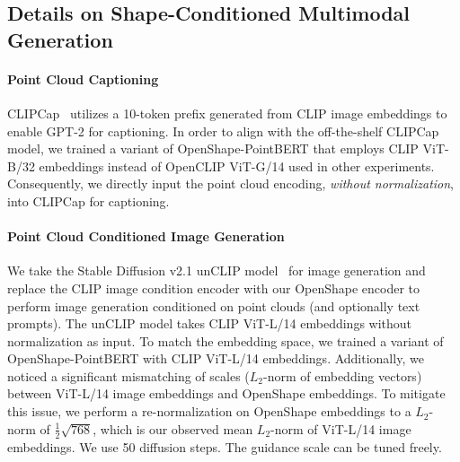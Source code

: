 \subsection{Details on Shape-Conditioned Multimodal Generation}
\paragraph{Point Cloud Captioning} 

CLIPCap~\cite{mokady2021clipcap} utilizes a 10-token prefix generated from CLIP image embeddings to enable GPT-2 for captioning. In order to align with the off-the-shelf CLIPCap model, we trained a variant of OpenShape-PointBERT that employs CLIP ViT-B/32 embeddings instead of OpenCLIP ViT-G/14 used in other experiments. Consequently, we directly input the point cloud encoding, \emph{without normalization}, into CLIPCap for captioning.

\paragraph{Point Cloud Conditioned Image Generation} We take the Stable Diffusion v2.1 unCLIP model~\cite{ramesh2022hierarchical} for image generation and replace the CLIP image condition encoder with our OpenShape encoder to perform image generation conditioned on point clouds (and optionally text prompts). The unCLIP model takes CLIP ViT-L/14 embeddings without normalization as input. To match the embedding space, we trained a variant of OpenShape-PointBERT with CLIP ViT-L/14 embeddings. Additionally, we noticed a significant mismatching of scales ($L_2$-norm of embedding vectors) between ViT-L/14 image embeddings and OpenShape embeddings. To mitigate this issue, we perform a re-normalization on OpenShape embeddings to a $L_2$-norm of $\frac{1}{2}\sqrt{768}$, which is our observed mean $L_2$-norm of ViT-L/14 image embeddings. We use 50 diffusion steps. The guidance scale can be tuned freely.



